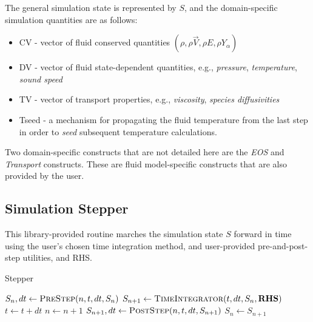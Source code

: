 \documentclass{article}
\begin{document}
The general simulation state is represented by $S$, and the domain-specific simulation quantities are as follows:
\begin{itemize}
\item{CV} - vector of fluid conserved quantities $(\rho, \rho\vec{V}, \rho{E}, \rho{Y}_\alpha)$
\item{DV} - vector of fluid state-dependent quantities, e.g., \textit{pressure}, \textit{temperature}, \textit{sound speed}
\item {TV} - vector of transport properties, e.g., \textit{viscosity}, \textit{species diffusivities}
\item {Tseed} - a mechanism for propagating the fluid temperature from the last step in order to \textit{seed} subsequent temperature calculations.
\end{itemize}

Two domain-specific constructs that are not detailed here are the \textit{EOS} and \textit{Transport} constructs.  These are fluid model-specific constructs that are also provided by the user.

\subsection{Simulation Stepper}
This library-provided routine marches the simulation state $S$ forward in time using the user's chosen time integration method, and user-provided pre-and-post-step utilities, and RHS.

\begin{algorithm}
  \caption{Stepper}
  \begin{algorithmic}[1]
    \State $S_n, dt \gets \Call{PreStep}{n, t, dt, S_n}$
    \State $S_{n+1} \gets \Call{TimeIntegrator}{t, dt, S_n, \mathbf{RHS}}$
    \State $t \gets t + dt$
    \State $n \gets n + 1$
    \State $S_{n+1}, dt \gets \Call{PostStep}{n, t, dt, S_{n+1}}$
    \State $S_n \gets S_{n+1}$
    \EndWhile
    \EndProcedure  \end{algorithmic}
\end{algorithm}
\end{document}
